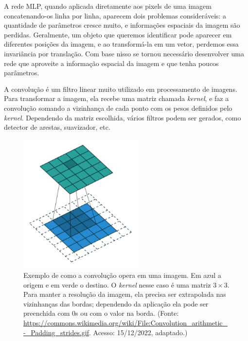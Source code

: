 

A rede MLP,
quando aplicada diretamente
aos pixels de uma imagem
concatenando-os linha por linha, aparecem
dois problemas consideráveis:
a quantidade de parâmetros cresce muito,
e informações espaciais da imagem
são perdidas. Geralmente, um objeto
que queremos identificar pode aparecer
em diferentes posições da imagem,
e ao transformá-la em um vetor,
perdemos essa invariância por translação.
Com base nisso se tornou necessário
desenvolver uma rede que aproveite
a informação espacial da imagem
e que tenha poucos parâmetros.


A convolução é um filtro linear 
muito utilizado em processamento
de imagens. Para transformar
a imagem, ela recebe uma matriz
chamada \textit{kernel}, e faz a convolução
somando a vizinhança de cada ponto
com os pesos definidos pelo \textit{kernel}.
Dependendo da matriz escolhida,
vários filtros podem ser gerados,
como detector de arestas, suavizador,
etc.

\begin{figure}[!ht]
	\centering
	\includegraphics[height=200pt]{files/assets/deeplearning/conv.png}
	\caption{Exemplo de como a convolução opera em uma imagem.
	Em azul a origem e em verde o destino. O \textit{kernel} nesse caso
	é uma matriz $3\times 3$. Para manter a resolução da imagem,
	ela precisa ser extrapolada nas vizinhanças das bordas; 
	dependendo da aplicação ela pode ser preenchida
	com 0s ou com o valor na borda. (Fonte:
	\url{https://commons.wikimedia.org/wiki/File:Convolution_arithmetic_-_Padding_strides.gif}. Acesso: 15/12/2022, adaptado.)}
	\label{img:preview}
\end{figure}


